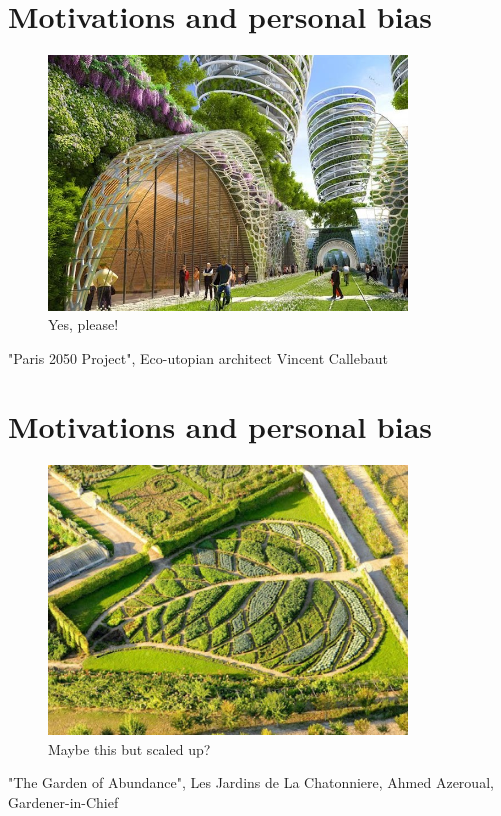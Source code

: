 \documentclass[
paper=128mm:96mm, %
fontsize=11pt, %
pagesize, %
parskip=half-, %
]{scrartcl} %
\theoremstyle{mythmstyle} %
\begin{document}
\section{Motivations and personal bias}
\begin{figure}
\centering
\includegraphics[width=0.85\textwidth]{Image3.jpg}
\caption{Yes, please!}
\end{figure}
\scriptsize
"Paris 2050 Project", Eco-utopian architect Vincent Callebaut\\

\clearpage
\section{Motivations and personal bias}
\begin{figure}
\centering
\includegraphics[width=0.85\textwidth]{Image4.jpg}
\caption{\scriptsize Maybe this but scaled up?}
\end{figure}
\scriptsize 
"The Garden of Abundance", Les Jardins de La Chatonniere, Ahmed Azeroual, Gardener-in-Chief
\clearpage
\end{document}
